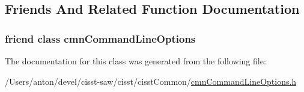 \subsection{Friends And Related Function Documentation}
\hypertarget{classcmn_command_line_options_1_1_option_multiple_values_base_a18923f23ed3914806f1edf878a64b422}{}
\subsubsection[{cmn\+Command\+Line\+Options}]{\setlength{\rightskip}{0pt plus 5cm}friend class {\bf cmn\+Command\+Line\+Options}\hspace{0.3cm}{\ttfamily [friend]}}\label{classcmn_command_line_options_1_1_option_multiple_values_base_a18923f23ed3914806f1edf878a64b422}


The documentation for this class was generated from the following file\+:\begin{DoxyCompactItemize}
\item 
/\+Users/anton/devel/cisst-\/saw/cisst/cisst\+Common/\hyperlink{cmn_command_line_options_8h}{cmn\+Command\+Line\+Options.\+h}\end{DoxyCompactItemize}
